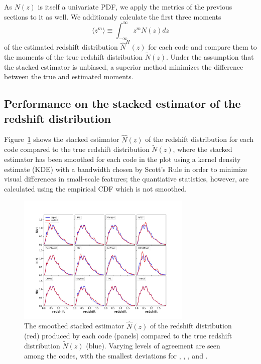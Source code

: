 As $N(z)$ is itself a univariate PDF, we apply the metrics of the previous sections to it as well.
We additionaly calculate the first three moments
\begin{equation}
  \label{eq:moment}
  \langle z^{m}\rangle \equiv \int_{-\infty}^{\infty} z^{m} N(z) dz
\end{equation}
of the estimated redshift distribution $\hat{N}^{H}(z)$ for each code and compare them to the moments of the true redshift distribution $\tilde{N}(z)$.
Under the assumption that the stacked estimator is unbiased, a superior method minimizes the difference between the true and estimated moments.

\subsection{Performance on the stacked estimator of the redshift distribution}
\label{sec:stackedmetrics_results}

Figure~\ref{fig:nz} shows the stacked estimator $\hat{N}(z)$ of the redshift distribution for each code compared to the true redshift distribution $\tilde{N}(z)$, where the stacked estimator has been smoothed for each code in the plot using a kernel density estimate (KDE) with a bandwidth chosen by Scott's Rule \citep{Scott:1992} in order to minimize visual differences in small-scale features; the quantiative statistics, however, are calculated using the empirical CDF which is not smoothed.

\begin{figure}
\centering
\includegraphics[width=0.74\textwidth]{fig/NZsumplot_12codes_scottsrule.jpg}
\caption{The smoothed stacked estimator $\hat{N}(z)$ of the redshift distribution (red) produced by each code (panels) compared to the true redshift distribution $\tilde{N}(z)$ (blue).
Varying levels of agreement are seen among the codes, with the smallest deviations for \cmnn, \flexzboost, \tpz, and \trainz.}
\label{fig:nz}
\end{figure}

